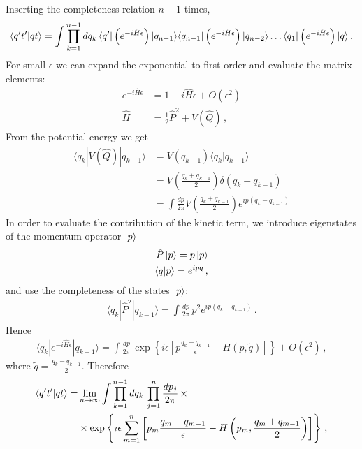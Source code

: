 \documentclass[notes]{subfiles}
\begin{document}
Inserting the completeness relation $n-1$ times,
\begin{align}
  \label{eq:AmplitudeStepOne}
  \braket{q't'}{qt} = \int \prod_{k=1}^{n-1}dq_k\,
  \langle q' | \left(e^{-i \hat{H} \epsilon}\right) |q_{n-1}\rangle
  \langle q_{n-1} | \left(e^{-i \hat{H} \epsilon}\right) |
  q_{n-2}\rangle \ldots \langle q_1 | \left(e^{-i \hat{H}
  \epsilon}\right) | q\rangle\, .
\end{align}
For small $\epsilon$ we can expand the exponential to first order and
evaluate the matrix elements:
\begin{align}
  e^{-i \hat{H} \epsilon} &= 1 - i \hat{H} \epsilon + O(\epsilon^2)\\
\hat{H} &= \frac12 \hat{P}^2 + V(\hat{Q})\, ,
\end{align}
From the potential energy we get
\begin{align}
  \langle q_k | V(\hat{Q}) | q_{k-1}\rangle &= V(q_{k-1}) \langle q_k
                                              | q_{k-1} \rangle \\
                                            &= V\left(\frac{q_k +
                                              q_{k-1}}{2}\right)
                                              \delta(q_k-q_{k-1}) \\
                                            & = \int \frac{dp}{2\pi} V\left(\frac{q_k +
                                              q_{k-1}}{2}\right) 
                                              e^{ip (q_k-q_{k-1})}
\end{align}
In order to evaluate the contribution of the kinetic term, we
introduce eigenstates of the momentum operator $\ket{p}$
\begin{align}
  \hat{P} \ket{p} = p \ket{p} \\
  \braket{q}{p} = e^{ipq}\, ,
\end{align}
and use the completeness of the states $\ket{p}$:
\begin{align}
  \langle q_k | \hat{P}^2 | q_{k-1}\rangle = 
  \int \frac{dp}{2\pi}\, p^2 e^{ip(q_k-q_{k-1})}\, .
\end{align}
Hence
\begin{align}
  \langle q_k | e^{-i\hat{H}\epsilon} | q_{k-1}\rangle = 
  \int \frac{dp}{2\pi}\, \exp\left\{i\epsilon \left[
  p \frac{q_k-q_{k-1}}{\epsilon} - H\left(p,\tilde{q}\right)
  \right]
  \right\} + O(\epsilon^2)\, ,
\end{align}
where $\tilde{q}=\frac{q_k-q_{k-1}}{2}$. Therefore
\begin{align}
  \braket{q't'}{qt} =& \lim_{n\to\infty} \int \prod_{k=1}^{n-1}dq_k\, 
  \prod_{j=1}^{n} \frac{dp_j}{2\pi}\, \times \\
  &\times \exp \left\{
    i\epsilon \sum_{m=1}^{n} \left[
    p_m \frac{q_m-q_{m-1}}{\epsilon} - H\left(p_m, 
    \frac{q_m+q_{m-1}}{2}\right)
    \right]
    \right\}\, ,
\end{align}
\end{document}
